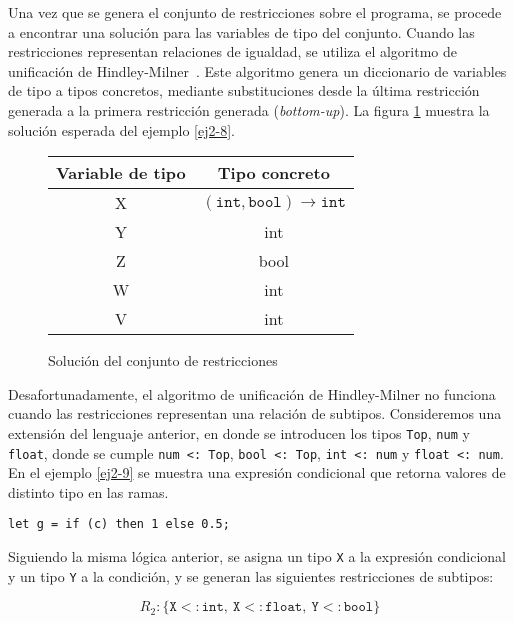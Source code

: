 Una vez que se genera el conjunto de restricciones sobre el programa, se procede a encontrar una solución para las variables de tipo del conjunto. Cuando las restricciones representan relaciones de igualdad, se utiliza el algoritmo de unificación de Hindley-Milner~\cite{damasmilner}. Este algoritmo genera un diccionario de variables de tipo a tipos concretos, mediante substituciones desde la última restricción generada a la primera restricción generada (\emph{bottom-up}). La figura \ref{tabla2} muestra la solución esperada del ejemplo \ref{ej2-8}.

\begin{figure}[ht]
  \centering
  \ttfamily
  \begin{tabular}{c c}
    Variable de tipo & Tipo concreto \\
    \hline
    X & $\mathtt{(int, bool) \rightarrow int}$  \\
    Y & int \\
    Z & bool \\
    W & int \\
    V & int \\
  \end{tabular}
  \caption{Solución del conjunto de restricciones}
  \label{tabla2}
\end{figure}

Desafortunadamente, el algoritmo de unificación de Hindley-Milner no funciona cuando las restricciones representan una relación de subtipos. Consideremos una extensión del lenguaje anterior,  en donde se introducen los tipos \texttt{Top}, \texttt{num} y \texttt{float}, donde se cumple \texttt{num <: Top}, \texttt{bool <: Top}, \texttt{int <: num} y \texttt{float <: num}. En el ejemplo \ref{ej2-9} se muestra una expresión condicional que retorna valores de distinto tipo en las ramas.
\vspace{0.8em}
\begin{ej}
  \normalfont
  \label{ej2-9}
\begin{lstlisting}[morekeywords={then}]
  let g = if (c) then 1 else 0.5;
\end{lstlisting}
\end{ej}

Siguiendo la misma lógica anterior, se asigna un tipo \texttt{X} a la expresión condicional y un tipo \texttt{Y} a la condición, y se generan las siguientes restricciones de subtipos:

\[
R_2: \{ \mathtt{X <: int,\ X <: float,\ Y <: bool} \}
\]


